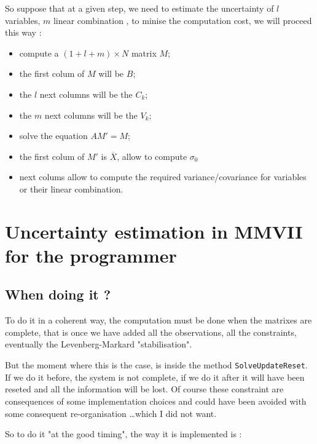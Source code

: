 So suppose that at a given step, we need to estimate the uncertainty of $l$ variables, $m$ linear combination , to minise
the computation cost, we will proceed this way :

\begin{itemize}
     \item  compute a $(1+l+m) \times N$ matrix $M$;
     \item  the first colum of $M$ will be $B$;
     \item  the $l$ next columns will be the $C_k$;
     \item  the $m$ next columns will be the $V_k$;
     \item  solve the  equation $A M' = M$;
     \item the first colum of $M'$ is $\overline X$, allow to compute $\sigma_0$
     \item next colums allow to compute the required variance/covariance for variables or their linear combination.
\end{itemize}



\section{Uncertainty estimation in MMVII for the programmer}

\subsection{When doing it ?} 

To do it  in a coherent way, the computation must be done when the matrixes are  complete, 
that is once we have added all the observations, all the constraints, eventually the
Levenberg-Markard "stabilisation".

But the moment where this is the case, is inside the method {\tt SolveUpdateReset}. If we do it before,
the system is not complete, if we do it after it will have been reseted and all the information will
be lost.  Of course these constraint are consequences of some implementation choices and could
have been avoided with some consequent re-organisation  \dots which I did not want.

So to do it "at the good timing", the way it is implemented is :

